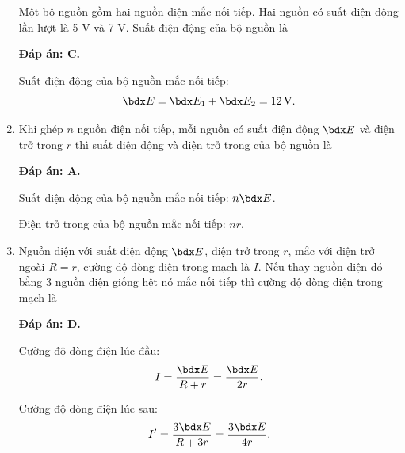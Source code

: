 \begin{enumerate}[label=\bfseries Câu \arabic*:]
	\cauhoi
	{Một bộ nguồn gồm hai nguồn điện mắc nối tiếp. Hai nguồn có suất điện động lần lượt là 5 V và 7 V. Suất điện động của bộ nguồn là
		
	}
	\loigiai
	{	\textbf{Đáp án: C.}
		
		Suất điện động của bộ nguồn mắc nối tiếp:
		$$\calE = \calE_1 + \calE_2 = \SI{12}{V}.$$
	}
	\item {}
	
	\cauhoi
	{Khi ghép $n$ nguồn điện nối tiếp, mỗi nguồn có suất điện động $\calE$ và điện trở trong $r$ thì suất điện động và điện trở trong của bộ nguồn là
		
	}
	\loigiai
	{	\textbf{Đáp án: A.}
		
		Suất điện động của bộ nguồn mắc nối tiếp: $n \calE$.
		
		Điện trở trong của bộ nguồn mắc nối tiếp: $nr$.
	}
	\item {}
	
	\cauhoi
	{Nguồn điện với suất điện động $\calE$, điện trở trong $r$, mắc với điện trở ngoài $R=r$, cường độ dòng điện trong mạch là $I$. Nếu thay nguồn điện đó bằng 3 nguồn điện giống hệt nó mắc nối tiếp thì cường độ dòng điện trong mạch là
		
	}
	\loigiai
	{	\textbf{Đáp án: D.}
		
		Cường độ dòng điện lúc đầu:
		$$I=\dfrac{\calE}{R+r} = \dfrac{\calE}{2r}.$$
		
		Cường độ dòng điện lúc sau:
		$$I' = \dfrac{3\calE}{R + 3r} = \dfrac{3\calE}{4r}.$$
		
}
\end{enumerate}
